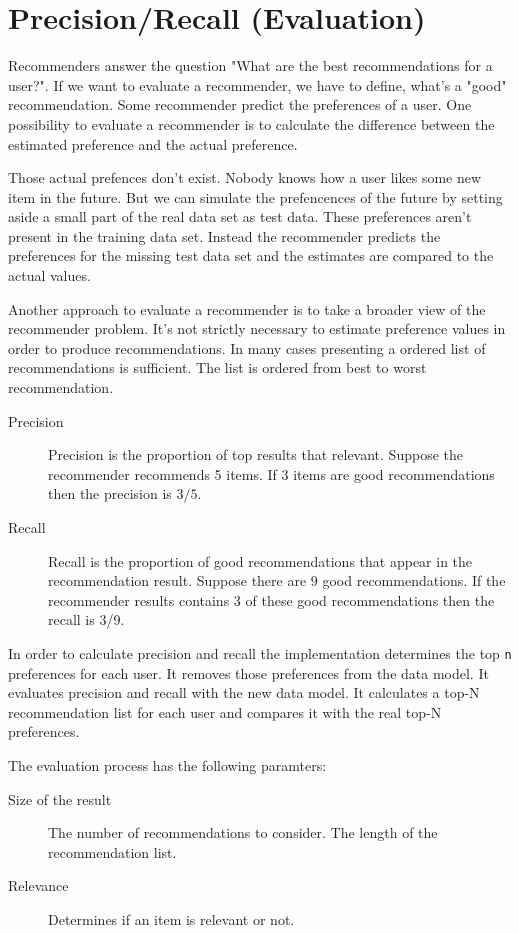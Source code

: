 \documentclass[twoside,a4paper]{article}
\begin{document}
\section{Precision/Recall (Evaluation)}
\label{sec:evaluation}
Recommenders answer the question "What are the best recommendations for a user?". If we want to evaluate a recommender, we have to define, what's a "good" recommendation.
Some recommender predict the preferences of a user. One possibility to evaluate a recommender is to calculate the difference between the estimated preference and the actual preference.

Those actual prefences don't exist. Nobody knows how a user likes some new item in the future.
But we can simulate the prefencences of the future by setting aside a small part of the real data set as test data. These preferences aren't present in the training data set. Instead the recommender predicts the preferences for the missing test data set and the estimates are compared to the actual values.

Another approach to evaluate a recommender is to take a broader view of the recommender problem. It's not strictly necessary to estimate preference values in order to produce recommendations. In many cases presenting a ordered list of recommendations is sufficient. The list is ordered from best to worst recommendation.

\begin{description}
\item[Precision] Precision is the proportion of top results that relevant. Suppose the recommender recommends 5 items. If 3 items are good recommendations then the precision is $3/5$.
\item[Recall] Recall is the proportion of good recommendations that appear in the recommendation result. Suppose there are 9 good recommendations. If the recommender results contains 3 of these good recommendations then the recall is 3/9.
\end{description}

In order to calculate precision and recall the implementation determines the top \verb|n| preferences for each user. It removes those preferences from the data model. It evaluates precision and recall with the new data model. It calculates a top-N recommendation list for each user and compares it with the real top-N preferences.

The evaluation process has the following paramters:
\begin{description}
\item[Size of the result] The number of recommendations to consider. The length of the recommendation list.
\item[Relevance] Determines if an item is relevant or not.
\end{description}
\end{document}

